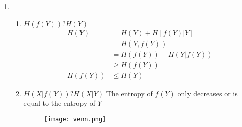 \documentclass[pdftex,12pt,a4paper]{article}
\begin{document}


\begin{enumerate}
    \item
        \begin{enumerate}
            \item $H(f(Y)) ? H(Y)$\\
                \begin{align}
                    H(Y) &= H(Y) + H[f(Y)|Y]\\
                         &= H(Y,f(Y))\\
                         &= H(f(Y)) + H(Y|f(Y))\\
                         &\ge H(f(Y))\\
                 H(f(Y)) &\le H(Y)
                \end{align}
            \item $H(X|f(Y)) ? H(X|Y)$
                The entropy of $f(Y)$ only decreases or is equal to the
                entropy of $Y$
                \begin{figure}[h]
                \centering
                \texttt{[image: venn.png]}
                \end{figure}


\end{enumerate}
\end{enumerate}
\end{document}
